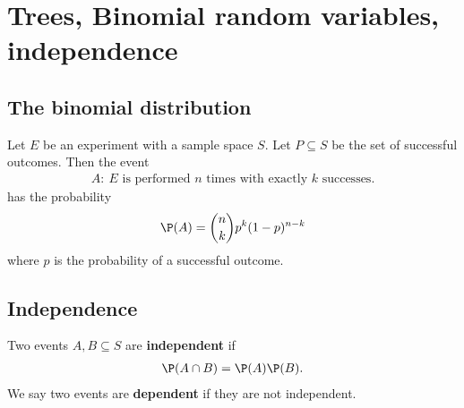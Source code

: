 \documentclass{article}
\begin{document}
\section{Trees, Binomial random variables, independence}
\subsection{The binomial distribution}
\begin{definition}
	Let $E$ be an experiment with a sample space $S$.
	Let $P\subseteq S$ be the set of successful outcomes.
	Then the event
	\begin{align*}
		A:\:\text{$E$ is performed $n$ times with exactly $k$ successes.}
	\end{align*}
	has the probability
	\begin{align*}
		\P(A) = \binom{n}{k}p^k (1-p)^{n-k}
	\end{align*}
	where $p$ is the probability of a successful outcome.
\end{definition}
\subsection{Independence}
\begin{definition}
	Two events $A,B\subseteq S$ are \textbf{independent} if
	\begin{align*}
		\P(A\cap B) = \P(A)\P(B).
	\end{align*}
	We say two events are \textbf{dependent} if they are not independent.
\end{definition}
\end{document}
